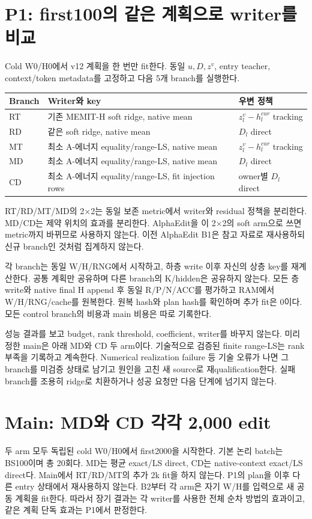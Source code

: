 \documentclass[11pt]{article}
\begin{document}
\section{P1: first100의 같은 계획으로 writer를 비교}
Cold W0/H0에서 v12 계획을 한 번만 fit한다. 동일 $u,D,z^v$, entry teacher,
context/token metadata를 고정하고 다음 5개 branch를 실행한다.

\begin{center}
\begin{tabular}{lll}
\toprule
Branch & Writer와 key & 우변 정책\\
\midrule
RT & 기존 MEMIT-H soft ridge, native mean & $z_l^v-h_l^{cur}$ tracking\\
RD & 같은 soft ridge, native mean & $D_l$ direct\\
MT & 최소 A-에너지 equality/range-LS, native mean & $z_l^v-h_l^{cur}$ tracking\\
MD & 최소 A-에너지 equality/range-LS, native mean & $D_l$ direct\\
CD & 최소 A-에너지 equality/range-LS, fit injection rows & owner별 $D_l$ direct\\
\bottomrule
\end{tabular}
\end{center}

RT/RD/MT/MD의 2$\times$2는 동일 보존 metric에서 writer와 residual 정책을
분리한다. MD/CD는 제약 위치의 효과를 분리한다. AlphaEdit을 이 2$\times$2의
soft arm으로 쓰면 metric까지 바뀌므로 사용하지 않는다. 이전 AlphaEdit B1은
참고 자료로 재사용하되 신규 branch인 것처럼 집계하지 않는다.

각 branch는 동일 W/H/RNG에서 시작하고, 하층 write 이후 자신의 상층 key를
재계산한다. 공통 계획만 공유하며 다른 branch의 K/hidden은 공유하지 않는다.
모든 층 write와 native final H append 후 동일 R/P/N/ACC를 평가하고 RAM에서
W/H/RNG/cache를 원복한다. 원복 hash와 plan hash를 확인하며 추가 fit은 0이다.
모든 control branch의 비용과 main 비용은 따로 기록한다.

성능 결과를 보고 budget, rank threshold, coefficient, writer를 바꾸지 않는다.
미리 정한 main은 아래 MD와 CD 두 arm이다. 기술적으로 검증된 finite range-LS는
rank 부족을 기록하고 계속한다. Numerical realization failure 등 기술 오류가 나면
그 branch를 미검증 상태로 남기고 원인을 고친 새 source로 재qualification한다.
실패 branch를 조용히 ridge로 치환하거나 성공 요청만 다음 단계에 넘기지 않는다.

\section{Main: MD와 CD 각각 2,000 edit}
두 arm 모두 독립된 cold W0/H0에서 first2000을 시작한다. 기본 논리 batch는
BS100이며 총 20회다. MD는 평균 exact/LS direct, CD는 native-context exact/LS
direct다. Main에서 RT/RD/MT의 추가 2k fit을 하지 않는다.
P1의 plan을 이후 다른 entry 상태에서 재사용하지 않는다. B2부터 각 arm은 자기
W/H를 입력으로 새 공동 계획을 fit한다. 따라서 장기 결과는 각 writer를 사용한
전체 순차 방법의 효과이고, 같은 계획 단독 효과는 P1에서 판정한다.
\end{document}
